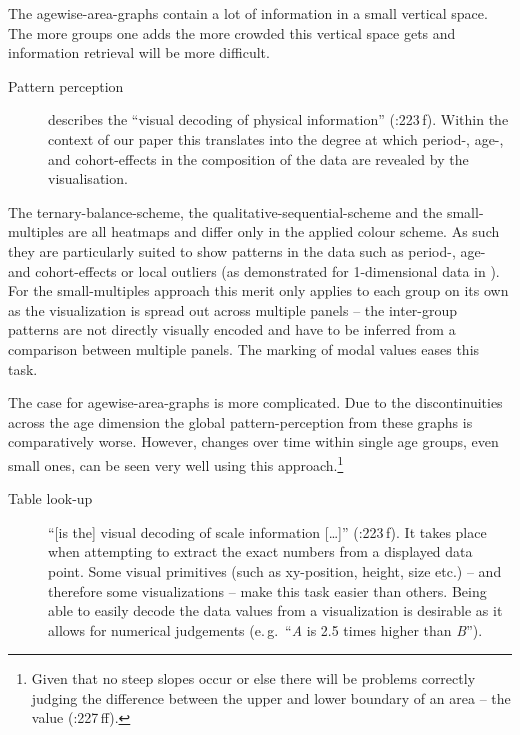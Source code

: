 \documentclass{scrartcl}
\begin{document}
The agewise-area-graphs contain a lot of information in a small vertical space. The more groups one adds the more crowded this vertical space gets and information retrieval will be more difficult.

\begin{description}
  \item[Pattern perception] describes the \enquote{visual decoding of physical information} (\cite{Cleveland1994}:223\,f). Within the context of our paper this translates into the degree at which  period-, age-, and cohort-effects in the composition of the data are revealed by the visualisation.
\end{description}

The ternary-balance-scheme, the qualitative-sequential-scheme and the small-multiples are all heatmaps and differ only in the applied colour scheme. As such they are particularly suited to show patterns in the data such as period-, age- and cohort-effects or local outliers (as demonstrated for 1-dimensional data in \cite{Vaupel1987}). For the small-multiples approach this merit only applies to each group on its own as the visualization is spread out across multiple panels -- the inter-group patterns are not directly visually encoded and have to be inferred from a comparison between multiple panels. The marking of modal values eases this task.

The case for agewise-area-graphs is more complicated. Due to the discontinuities across the age dimension the global pattern-perception from these graphs is comparatively worse. However, changes over time within single age groups, even small ones, can be seen very well using this approach.\footnote{Given that no steep slopes occur or else there will be problems correctly judging the difference between the upper and lower boundary of an area -- the value (\cite{Cleveland1994}:227\,ff).}

\begin{description}
  \item[Table look-up] \enquote{[is the] visual decoding of scale information [\ldots]} (\cite{Cleveland1994}:223\,f). It takes place when attempting to extract the exact numbers from a displayed data point. Some visual primitives (such as xy-position, height, size etc.) -- and therefore some visualizations -- make this task easier than others. Being able to easily decode the data values from a visualization is desirable as it allows for numerical judgements (e.\,g.~\enquote{\emph{A} is 2.5 times higher than \emph{B}}).
\end{description}
\end{document}
